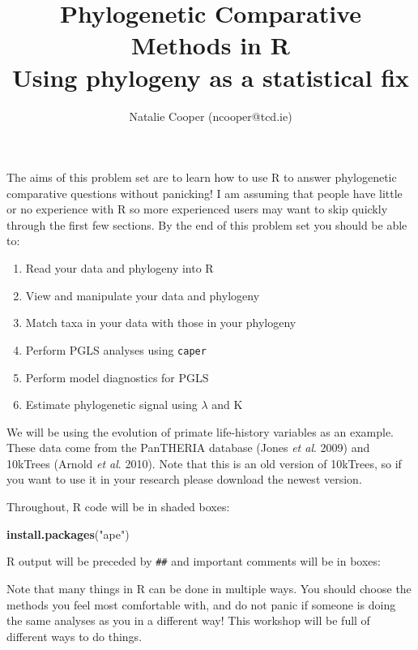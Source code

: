\documentclass[12pt]{article}
\newcommand{\KeywordTok}[1]{\textcolor[rgb]{0.13,0.29,0.53}{\textbf{{#1}}}}
\newcommand{\StringTok}[1]{\textcolor[rgb]{0.31,0.60,0.02}{{#1}}}
\newcommand{\NormalTok}[1]{{#1}}
\begin{document}
\title{Phylogenetic Comparative Methods in R\\
Using phylogeny as a statistical fix}
\author{Natalie Cooper (ncooper@tcd.ie)}
\date{}
\maketitle

The aims of this problem set are to learn how to use R to answer phylogenetic 
comparative questions without panicking! I am assuming that people have little or no
experience with R so more experienced users may want to skip quickly through the first 
few sections. By the end of this problem set you should be able to:

\begin{enumerate}
\item Read your data and phylogeny into R
\item View and manipulate your data and phylogeny
\item Match taxa in your data with those in your phylogeny
\item Perform PGLS analyses using \texttt{caper}
\item Perform model diagnostics for PGLS
\item Estimate phylogenetic signal using $\lambda$ and K
\end{enumerate}

We will be using the evolution of primate life-history variables as an
example. These data come from the PanTHERIA database (Jones \textit{et
al}. 2009) and 10kTrees (Arnold \textit{et al}. 2010). Note that this is
an old version of 10kTrees, so if you want to use it in your research
please download the newest version.

Throughout, R code will be in shaded boxes:

\begin{snugshade}
\begin{Highlighting}[]
\KeywordTok{install.packages}\NormalTok{(}\StringTok{"ape"}\NormalTok{)}
\end{Highlighting}
\end{snugshade}

R output will be preceded by \texttt{\#\#} and important comments will be in boxes:

\begin{framed}
Note that many things in R can be done in multiple ways. You should
choose the methods you feel most comfortable with, and do not panic if
someone is doing the same analyses as you in a different way! This
workshop will be full of different ways to do things.
\end{framed}
\end{document}
